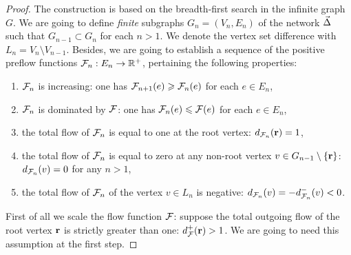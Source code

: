 \documentclass[12pt]{amsart}
\begin{document}
\begin{proof}
      The construction is based on the breadth-first search in the infinite graph $G$.
      We are going to define \emph{finite} subgraphs $G_n = (V_n, E_n)$ of the network $\vec{\Delta}$ such that $G_{n-1} \subset G_{n}$ for each $n > 1$.
      We denote the vertex set difference with $L_n = V_n \setminus V_{n-1}$.
      Besides, we are going to establish a sequence of the positive preflow functions $\mathcal{F}_{n}: E_n \to \mathbb{R}^{+}$,
        pertaining the following properties:
        \begin{enumerate}[label=\textbf{P\arabic*}]
          \item \label{p1} $\mathcal{F}_{n}$ is increasing:
            one has $\mathcal{F}_{n+1}(e) \geqslant \mathcal{F}_{n}(e)$ for each $e \in E_n$,
          \item \label{p2} $\mathcal{F}_{n}$ is dominated by $\mathcal{F}$:
            one has $\mathcal{F}_{n}(e) \leqslant \mathcal{F}(e)$ for each $e \in E_n$,
          \item \label{p3} the total flow of $\mathcal{F}_{n}$ is equal to one at the root vertex: $d_{\mathcal{F}_{n}}(\mathbf{r}) = 1$,
          \item \label{p4} the total flow of $\mathcal{F}_{n}$ is equal to zero at any non-root vertex
            $v \in G_{n-1}\setminus \left\{\mathbf{r}\right\}$: $d_{\mathcal{F}_{n}}(v) = 0$ for any $n > 1$,
          \item \label{p5} the total flow of $\mathcal{F}_{n}$
            of the vertex $v \in L_n$ is negative: $d_{\mathcal{F}_{n}}(v) = -d^{-}_{\mathcal{F}_{n}}(v) < 0$.
        \end{enumerate}
      First of all we scale the flow function $\mathcal{F}$: suppose the total outgoing flow of the root vertex $\mathbf{r}$ is strictly greater than one:
        $d^{+}_{\mathcal{F}}(\mathbf{r}) > 1$.
      We are going to need this assumption at the first step.


\end{proof}
\end{document}
